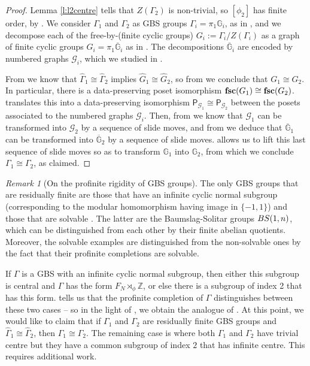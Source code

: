 \documentclass[11pt, a4 paper]{amsart}
\numberwithin{equation}{section}
\theoremstyle{remark}
\newtheorem{remark}[theorem]{Remark}
\theoremstyle{definition}
\def\Z{\mathbb Z}
\def\G{\Gamma}
\def\-{\overline}
\def\wh{\widehat}
\def\tsc{{\rm{\bf{fsc}}}}
\def\GG{\mathbb{G}}
\def\-{\overline}
\def\G{\Gamma}
\begin{document}
\thmmain*

\begin{proof}
	Lemma \ref{l:l2centre} tells that $Z(\G_2)$ is non-trivial, 
	so $[\phi_2]$ has finite order, 
	by . 
	We consider $\G_1$ and $\G_2$ as GBS groups $\G_i=\pi_1\GG_i$, 
	as in , 
	and we decompose each of the 
	free-by-(finite cyclic groups) $G_i:=\G_i/Z(\G_i)$ 
	as a graph of finite cyclic groups $G_i=\pi_1\-{\GG}_i$ 
	as in . 
	The decompositions $\-{\GG}_i$ are encoded 
	by numbered graphs $\mathcal{G}_i$, 
	which we studied in . 
	
	From  we know that $\wh{\G}_1\cong\wh{\G}_2$ implies
	$\wh{G}_1 \cong \wh{G}_2$, so from  we conclude that $G_1\cong G_2$. 
	In particular, there is a data-preserving poset isomorphism 
	$\tsc(G_1)\cong\tsc(G_2)$.
	 translates this 
	into a data-preserving isomorphism 
	$\mathsf{P}_{\mathcal{G}_1}\cong\mathsf{P}_{\mathcal{G}_2}$ 
	between the posets associated 
	to the numbered graphs ${\mathcal{G}_i}$. 
	Then, from  we know that 
	$\mathcal{G}_1$ can be transformed into $\mathcal{G}_2$ 
	by a sequence of slide moves,
	and from  we deduce that 
	$\-{\GG}_1$ can be transformed into $\-{\GG}_2$ 
	by a sequence of slide moves. 
	 allows us to lift this 
	last sequence of slide moves 
	so as to transform $\GG_1$ into $\GG_2$, 
	from which we conclude $\G_1 \cong \G_2$, as claimed. 
\end{proof}

\begin{remark}
[On the profinite rigidity of GBS groups] 
\label{r:GBS}
	The only GBS groups that are residually finite are those that have an infinite cyclic normal subgroup (corresponding to the modular homomorphism having image in $\{-1,1\}$)
	and those that are solvable \cite{levitt2015generalized}. 
	The latter are the Baumslag-Solitar groups ${\rm{BS}}(1,n)$, which can be distinguished from each other by their finite abelian quotients. Moreover, the solvable examples are distinguished from the non-solvable ones by the fact that their profinite completions are solvable. 
	
	If $\G$ is a GBS with an infinite cyclic normal subgroup, then either this subgroup
	is central and $\G$ has the form $F_N\rtimes_\phi\Z$, or else there is a subgroup of index 2 that has this form.
	 tells us 
	that the profinite completion of $\G$ 
	distinguishes between these two cases -- 
	so in the light of , 
	we obtain the analogue of . 
	At this point, we would like to claim that 
	if $\G_1$ and $\G_2$ are residually finite GBS groups 
	and $\wh{\G}_1\cong\wh{\G}_2$, then $\G_1\cong\G_2$. 
	The remaining case is where both $\G_1$ and $\G_2$ have trivial
	centre but they have a common subgroup of index $2$ that has infinite centre. 
	This requires additional work. %
\end{remark}
 
\end{document}

